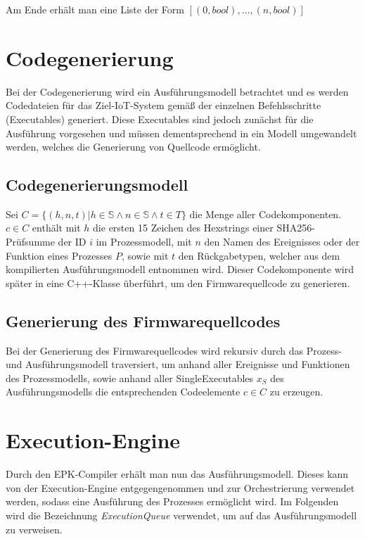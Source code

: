 Am Ende erhält man eine Liste der Form $[(0, bool), \dots, (n, bool)]$


\section{Codegenerierung}
\label{code-generation-model}

Bei der Codegenerierung wird ein Ausführungsmodell betrachtet und es werden Codedateien für das Ziel-IoT-System gemäß der einzelnen
Befehlsschritte (Executables) generiert. Diese Executables sind jedoch zunächst für die Ausführung vorgesehen und müssen dementsprechend
in ein Modell umgewandelt werden, welches die Generierung von Quellcode ermöglicht.

\subsection{Codegenerierungsmodell}
\label{codegeneration-model}

Sei $C = \{(h, n, t) | h \in \mathbb{S} \land n \in \mathbb{S} \land t \in T\}$ die Menge aller Codekomponenten. $c \in C$ enthält mit $h$ die ersten 15 Zeichen des Hexstrings einer \ac{SHA256}-Prüfsumme der ID $i$ im Prozessmodell, mit $n$ den Namen des Ereignisses oder der Funktion eines Prozesses $P$,
sowie mit $t$ den Rückgabetypen, welcher aus dem kompilierten Ausführungsmodell entnommen wird. Dieser Codekomponente wird später in eine C++-Klasse überführt, um den Firmwarequellcode zu generieren.

\subsection{Generierung des Firmwarequellcodes}

Bei der Generierung des Firmwarequellcodes wird rekursiv durch das Prozess- und Ausführungsmodell traversiert, um anhand aller Ereignisse und Funktionen des Prozessmodells, sowie anhand aller SingleExecutables $x_S$ des Ausführungsmodells die entsprechenden
Codeelemente $c \in C$ zu erzeugen.



\section{Execution-Engine}
\label{execution-engine}

Durch den EPK-Compiler erhält man nun das Ausführungsmodell. Dieses kann von der Execution-Engine entgegengenommen und zur Orchestrierung verwendet
werden, sodass eine Ausführung des Prozesses ermöglicht wird. Im Folgenden wird die Bezeichnung \textit{ExecutionQueue} verwendet, um auf das
Ausführungsmodell zu verweisen.

